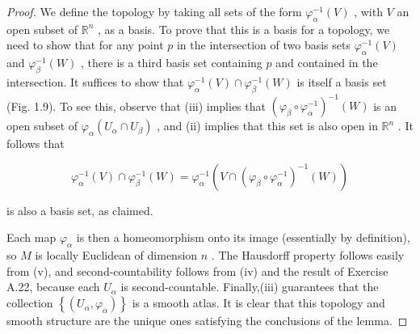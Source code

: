 \begin{proof}
\leanok
We define the topology by taking all sets of the form ${\varphi }_{\alpha }^{-1}\left( V\right)$ , with $V$ an open subset of ${\mathbb{R}}^{n}$ , as a basis. To prove that this is a basis for a topology, we need to show that for any point $p$ in the intersection of two basis sets ${\varphi }_{\alpha }^{-1}\left( V\right)$ and ${\varphi }_{\beta }^{-1}\left( W\right)$ , there is a third basis set containing $p$ and contained in the intersection. It suffices to show that ${\varphi }_{\alpha }^{-1}\left( V\right)  \cap  {\varphi }_{\beta }^{-1}\left( W\right)$ is itself a basis set (Fig. 1.9). To see this, observe that (iii) implies that ${\left( {\varphi }_{\beta } \circ  {\varphi }_{\alpha }^{-1}\right) }^{-1}\left( W\right)$ is an open subset of ${\varphi }_{\alpha }\left( {{U}_{\alpha } \cap  {U}_{\beta }}\right)$ , and (ii) implies that this set is also open in ${\mathbb{R}}^{n}$ . It follows that

\[
{\varphi }_{\alpha }^{-1}\left( V\right)  \cap  {\varphi }_{\beta }^{-1}\left( W\right)  = {\varphi }_{\alpha }^{-1}\left( {V \cap  {\left( {\varphi }_{\beta } \circ  {\varphi }_{\alpha }^{-1}\right) }^{-1}\left( W\right) }\right)
\]

is also a basis set, as claimed.

Each map ${\varphi }_{\alpha }$ is then a homeomorphism onto its image (essentially by definition), so $M$ is locally Euclidean of dimension $n$ . The Hausdorff property follows easily from (v), and second-countability follows from (iv) and the result of Exercise A.22, because each ${U}_{\alpha }$ is second-countable. Finally,(iii) guarantees that the collection $\left\{  \left( {{U}_{\alpha },{\varphi }_{\alpha }}\right) \right\}$ is a smooth atlas. It is clear that this topology and smooth structure are the unique ones satisfying the conclusions of the lemma.
\end{proof}

